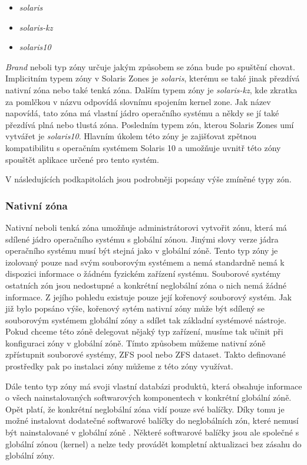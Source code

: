 \begin{itemize}
 \item \textit{solaris}
 \item \textit{solaris-kz}
 \item \textit{solaris10}
\end{itemize}

\textit{Brand} neboli typ zóny určuje jakým způsobem se zóna bude po spuštění chovat. Implicitním typem zóny v Solaris Zones
je \textit{solaris}, kterému se také jinak přezdívá nativní zóna nebo také tenká zóna. Dalším typem zóny je \textit{solaris-kz},
kde zkratka za pomlčkou v názvu odpovídá slovnímu spojením kernel zone. Jak název napovídá, tato zóna má vlastní jádro
operačního systému a někdy se jí také přezdívá plná nebo tlustá zóna. Posledním typem zón, kterou Solaris Zones umí vytvářet
je \textit{solaris10}. Hlavním úkolem této zóny je zajišťovat zpětnou kompatibilitu s operačním systémem Solaris 10 a umožňuje
uvnitř této zóny spouštět aplikace určené pro tento systém.

V následujících podkapitolách jsou podrobněji popsány výše zmíněné typy zón.
\subsubsection{Nativní zóna}
\label{chapter:zones:native}
Nativní neboli tenká zóna umožňuje administrátorovi vytvořit zónu, která má sdílené jádro operačního systému s globální zónou.
Jinými slovy verze jádra operačního systému musí být stejná jako v globální zóně. Tento typ zóny je izolovaný pouze nad svým
souborovým systémem a nemá standardně nemá k dispozici informace o žádném fyzickém zařízení systému. Souborové systémy ostatních
zón jsou nedostupné a konkrétní neglobální zóna o nich nemá žádné informace. Z jejího pohledu existuje pouze její kořenový
souborový systém. Jak již bylo popsáno výše, kořenový sytém nativní zóny může být sdílený se souborovým systémem globální
zóny a sdílet tak základní systémové nástroje. Pokud chceme této zóně delegovat nějaký typ zařízení, musíme tak učinit při
konfiguraci zóny v globální zóně. Tímto způsobem můžeme nativní zóně zpřístupnit souborové systémy, ZFS pool nebo
ZFS dataset. Takto definované prostředky pak po instalaci zóny můžeme z této zóny využívat.

Dále tento typ zóny má svoji vlastní databázi produktů, která obsahuje informace o všech nainstalovaných softwarových
komponentech v konkrétní globální zóně. Opět platí, že konkrétní neglobální zóna vidí pouze své balíčky. Díky tomu je možné
instalovat dodatečné softwarové balíčky do neglobálních zón, které nemusí být nainstalované v globální zóně
\cite{oracle:solaris:zones:brands}. Některé softwarové balíčky jsou ale společné s globální zónou (kernel) a nelze tedy
provádět kompletní aktualizaci bez zásahu do globální zóny. 

